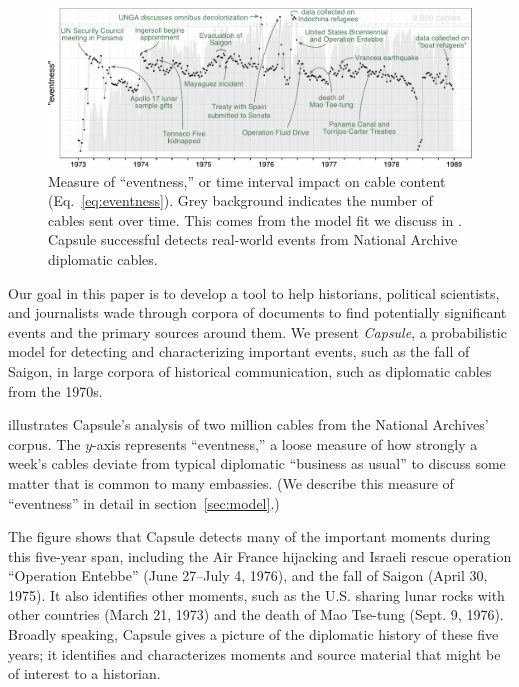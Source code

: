 \begin{figure}[ht]
\centering
\includegraphics[width=\linewidth]{fig/cables_events.pdf}
\caption{Measure of ``eventness,'' or time interval impact on cable content (Eq.~\ref{eq:eventness}).  Grey background indicates the number of cables sent over time.  This comes from the model fit we discuss in .  Capsule successful detects real-world events from National Archive diplomatic cables.}
\label{fig:cables_events}
\end{figure}

Our goal in this paper is to develop a tool to help historians,
political scientists, and journalists wade through corpora of
documents to find potentially significant events and the primary
sources around them. We present \textit{Capsule}, a probabilistic
model for detecting and characterizing important events, such as the
fall of Saigon, in large corpora of historical communication, such as
diplomatic cables from the 1970s.

 illustrates Capsule's analysis of two million
cables from the National Archives' corpus. The \mbox{$y$-axis}
represents ``eventness,'' a loose measure of how strongly a week's
cables deviate from typical diplomatic ``business as usual'' to
discuss some matter that is common to many embassies. (We describe
this measure of ``eventness'' in detail in section~\ref{sec:model}.)

The figure shows that Capsule detects many of the important moments
during this five-year span, including the Air France hijacking and
Israeli rescue operation ``Operation Entebbe'' (June 27--July 4,
1976), and the fall of Saigon (April 30, 1975). It also identifies
other moments, such as the U.S. sharing lunar rocks with other
countries (March 21, 1973) and the death of Mao Tse-tung (Sept. 9,
1976). Broadly speaking, Capsule gives a picture of the diplomatic
history of these five years; it identifies and characterizes moments
and source material that might be of interest to a historian.

